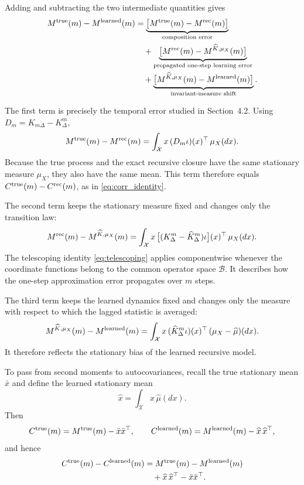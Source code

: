 \documentclass[final,hidelinks]{siamart251216}
\newcommand{\cX}{\mathcal{X}}
\begin{document}
Adding and subtracting the two intermediate quantities gives
\begin{align}
    M^{\rm true}(m)-M^{\rm learned}(m)
    &=
    \underbrace{
        \bigl[
        M^{\rm true}(m)-M^{\rm rec}(m)
        \bigr]
    }_{\text{composition error}}
    \nonumber\\
    &\quad+
    \underbrace{
        \bigl[
        M^{\rm rec}(m)-M^{\widehat K,\mu_X}(m)
        \bigr]
    }_{\text{propagated one-step learning error}}
    \nonumber\\
    &\quad+
    \underbrace{
        \bigl[
        M^{\widehat K,\mu_X}(m)-M^{\rm learned}(m)
        \bigr]
    }_{\text{invariant-measure shift}}.
    \label{eq:three_error}
\end{align}

The first term is precisely the temporal error studied in Section~4.2.
Using $D_m=K_{m\Delta}-K_\Delta^m$,
\[
    M^{\rm true}(m)-M^{\rm rec}(m)
    =
    \int_{\cX}
    x\,
    (D_m\iota)(x)^\top
    \,\mu_X(dx).
\]
Because the true process and the exact recursive closure have the same
stationary measure $\mu_X$, they also have the same mean. This term
therefore equals $C^{\rm true}(m)-C^{\rm rec}(m)$, as in
\eqref{eq:corr_identity}.

The second term keeps the stationary measure fixed and changes only the
transition law:
\[
    M^{\rm rec}(m)-M^{\widehat K,\mu_X}(m)
    =
    \int_{\cX}
    x\,
    \bigl[
        (K_\Delta^m-\widehat K_\Delta^m)\iota
    \bigr](x)^\top
    \,\mu_X(dx).
\]
The telescoping identity \eqref{eq:telescoping} applies componentwise
whenever the coordinate functions belong to the common operator space
$\mathcal B$. It describes how the one-step approximation error
propagates over $m$ steps.

The third term keeps the learned dynamics fixed and changes only the
measure with respect to which the lagged statistic is averaged:
\[
    M^{\widehat K,\mu_X}(m)-M^{\rm learned}(m)
    =
    \int_{\cX}
    x\,
    (\widehat K_\Delta^m\iota)(x)^\top
    \,(\mu_X-\widehat\mu)(dx).
\]
It therefore reflects the stationary bias of the learned recursive model.

To pass from second moments to autocovariances, recall the true stationary
mean $\bar x$ and define the learned stationary mean
\[
    \widehat x
    =
    \int_{\cX}x\,\widehat\mu(dx).
\]
Then
\[
    C^{\rm true}(m)
    =
    M^{\rm true}(m)-\bar x\bar x^\top,
    \qquad
    C^{\rm learned}(m)
    =
    M^{\rm learned}(m)-\widehat x\,\widehat x^\top,
\]
and hence
\begin{equation}
\begin{aligned}
    C^{\rm true}(m)-C^{\rm learned}(m)
    &=
    M^{\rm true}(m)-M^{\rm learned}(m)\\
    &\quad+
    \widehat x\,\widehat x^\top
    -
    \bar x\bar x^\top.
\end{aligned}
    \label{eq:learned_covariance_error}
\end{equation}
\end{document}
